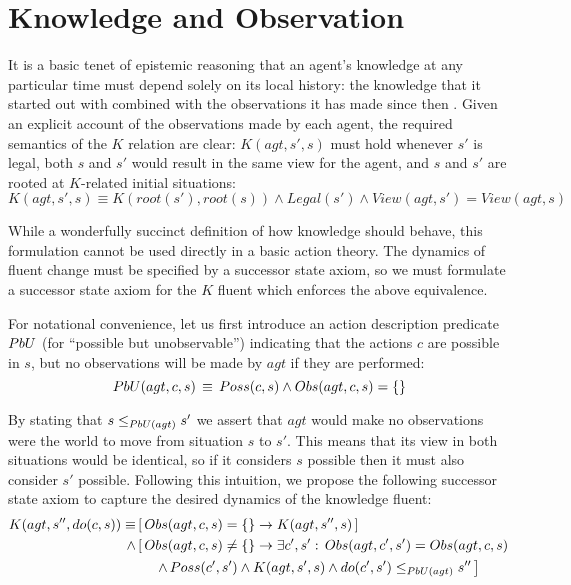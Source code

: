 \section{Knowledge and Observation\label{sub:Knowledge-and-Observation}}

It is a basic tenet of epistemic reasoning that an agent's knowledge
at any particular time must depend solely on its local history: the
knowledge that it started out with combined with the observations
it has made since then \citep{halpern90knowledge_distrib}. Given
an explicit account of the observations made by each agent, the required
semantics of the $K$ relation are clear: $K(agt,s',s)$ must hold
whenever $s'$ is legal, both $s$ and $s'$ would result in the same
view for the agent, and $s$ and $s'$ are rooted at $K$-related
initial situations:\begin{equation}
K(agt,s',s)\equiv K(root(s'),root(s))\wedge Legal(s')\wedge View(agt,s')=View(agt,s)\label{eq:k-desired}\end{equation}


While a wonderfully succinct definition of how knowledge should behave,
this formulation cannot be used directly in a basic action theory.
The dynamics of fluent change must be specified by a successor state
axiom, so we must formulate a successor state axiom for the $K$ fluent
which enforces the above equivalence.

For notational convenience, let us first introduce an action description
predicate $PbU$ (for {}``possible but unobservable'') indicating
that the actions $c$ are possible in $s$, but no observations will
be made by $agt$ if they are performed:\begin{equation}
PbU(agt,c,s)\,\equiv\, Poss(c,s)\wedge Obs(agt,c,s)=\{\}\label{eqn:PbU_defn}\end{equation}


By stating that $s\leq_{PbU(agt)}s'$ we assert that $agt$ would
make no observations were the world to move from situation $s$ to
$s'$. This means that its view in both situations would be identical,
so if it considers $s$ possible then it must also consider $s'$
possible. Following this intuition, we propose the following successor
state axiom to capture the desired dynamics of the knowledge fluent:\begin{align}
K(agt,s'',do(c,s))\equiv & \left[\, Obs(agt,c,s)=\{\}\rightarrow K(agt,s'',s)\,\right]\nonumber \\
\wedge & \left[\, Obs(agt,c,s)\neq\{\}\rightarrow\exists c',s':\, Obs(agt,c',s')=Obs(agt,c,s)\right.\nonumber \\
 & \left.\,\,\,\,\,\,\,\,\wedge\, Poss(c',s')\wedge K(agt,s',s)\wedge do(c',s')\leq_{PbU(agt)}s''\,\right]\label{eqn:new_k_ssa}\end{align}


